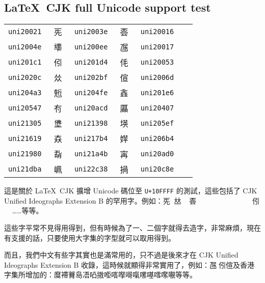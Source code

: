 \documentclass[12pt,a4paper]{article}
\begin{document}
\begin{CJK}{UTF8}{songext}
\begin{center}
\section*{\LaTeX\ CJK full Unicode support test}

\begin{tabular}{>{\tt }p{2cm}p{1cm}>{\tt }p{2cm}p{1cm}>{\tt }p{2cm}p{1cm}}
\hline
uni20021 & 𠀡 & uni2003e & 𠀾 & uni20016 & 𠀖     \\
uni2004e & 𠁎 & uni200ee & 𠃮 & uni20017 & 𠀗    \\
uni201c1 & 𠇁 & uni201d4 & 𠇔 & uni20053 & 𠁓 \\
uni2020c & 𠈌 & uni202bf & 𠊿 & uni2006d & 𠁭 \\
uni204a3 & 𠒣 & uni204fe & 𠓾 & uni201e6 & 𠇦 \\
uni20547 & 𠕇 & uni20acd & 𠫍 & uni20407 & 𠐇 \\
uni21305 & 𡌅 & uni21398 & 𡎘 & uni205ef & 𠗯 \\
uni21619 & 𡘙 & uni217b4 & 𡞴 & uni206b4 & 𠚴 \\
uni21980 & 𡦀 & uni21a4b & 𡩋 & uni20ad0 & 𠫐 \\
uni21dba & 𡶺 & uni22c38 & 𢰸 & uni20c8e & 𠲎 \\
\hline
\end{tabular}
\end{center}

這是關於 \LaTeX\ CJK 擴增 Unicode 碼位至 \texttt{U+10FFFF} 的測試，這些包括了 CJK Unified Ideographs Extension B 的罕用字。例如：𠀡𠀢𠀣𠀤𠀥𠀻𠀼𠀽𠀾𠁁𠁍𠁛𠁜𠁘𠁞𠁠𠂁𠂃𠁷𠂅𠂕𠂐𠂏𠃃𠃂𠃙𠃈𠃇𠃬𠃦𠃭𠃻𠃺𠄣𠄷𠅠𠆆𠇁𠇀𠇂𠈿𠈾……等等。

這些字平常不見得用得到，但有時候為了一、二個字就得去造字，非常麻煩，現在有支援的話，只要使用大字集的字型就可以取用得到。

而且，我們中文有些字其實也是滿常用的，只不過是後來才在 CJK Unified Ideographs Extension B 收錄，這時候就顯得非常實用了，例如：𠃮𠆧𠇁𠊿及香港字集所增加的：𪎩𧜵𧀎𡷊𠗐𠱂𢳆𠳔𠸉𠸎𠹭𠺪𠼱𠼻𠽌𡁵𡃁等等。

\end{CJK}
\end{document}
